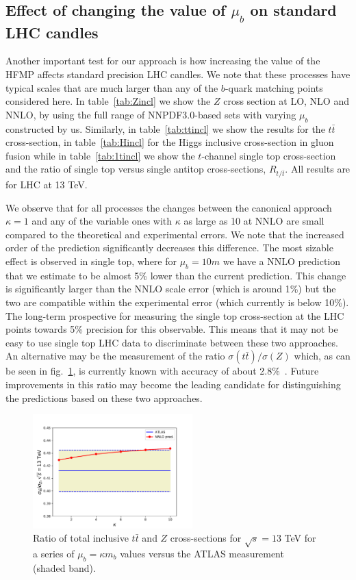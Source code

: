 \documentclass[letter,11pt]{article}
\def\t{{\bar t}}
\def\mub{\mu_b}
\def\k{\kappa}
\begin{document}
\subsection{Effect of changing the value of $\mub$ on standard LHC candles}

Another important test for our approach is how increasing the value of the HFMP affects standard precision LHC candles. We note that these processes have typical scales that are much larger than any of the $b$-quark matching points considered here. In table~\ref{tab:Zincl} we show the $Z$ cross section at LO, NLO and NNLO, by using the full range of NNPDF3.0-based sets with varying $\mub$ constructed by us. Similarly, in table~\ref{tab:ttincl} we show the results for the $t\t$ cross-section, in table~\ref{tab:Hincl} for the Higgs inclusive cross-section in gluon fusion while in table~\ref{tab:1tincl} we show the $t$-channel single top cross-section and the ratio of single top versus single antitop cross-sections, $R_{t/\bar{t}}$. All results are for LHC at 13 TeV.

We observe that for all processes the changes between the canonical approach $\k=1$ and any of the variable ones with $\k$ as large as 10 at NNLO are small compared to the theoretical and experimental errors. We note that the increased order of the prediction significantly decreases this difference. The most sizable effect is observed in single top, where for $\mub=10m$ we have a NNLO prediction that we estimate to be almost 5\% lower than the current prediction. This change is significantly larger than the NNLO scale error (which is around 1\%) but the two are compatible within the experimental error (which currently is below 10\%). The long-term prospective for measuring the single top cross-section at the LHC points towards 5\% precision for this observable. This means that it may not be easy to use single top LHC data to discriminate between these two approaches. An alternative may be the measurement of the ratio $\sigma(t\t)/\sigma(Z)$ which, as can be seen in fig.~\ref{fig:tt_z},  is currently known with accuracy of about 2.8\%~\cite{Aaboud:2016zpd}. Future improvements in this ratio may become the leading candidate for distinguishing the predictions based on these two approaches.
%
\begin{figure}[t]
\centering
\includegraphics[width=0.55\textwidth]{./tt_z.pdf}
\caption{Ratio of total inclusive $t\t$ and $Z$ cross-sections for $\sqrt{s}=13$ TeV for a series of $\mub = \kappa m_b$ values versus the ATLAS measurement~\cite{Aaboud:2016zpd} (shaded band).}
\label{fig:tt_z}
\end{figure}
%
\end{document}
